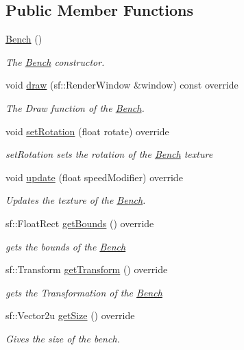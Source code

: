 \subsection*{Public Member Functions}
\begin{DoxyCompactItemize}
\item 
\hyperlink{class_bench_adb6c5dc00554246d493f9acbef4eaf51}{Bench} ()
\begin{DoxyCompactList}\small\item\em The \hyperlink{class_bench}{Bench} constructor. \end{DoxyCompactList}\item 
void \hyperlink{class_bench_a40fc8955782e814153234daa67bc4dd5}{draw} (sf\+::\+Render\+Window \&window) const override
\begin{DoxyCompactList}\small\item\em The Draw function of the \hyperlink{class_bench}{Bench}. \end{DoxyCompactList}\item 
void \hyperlink{class_bench_a8a9e65dde803b5f510fa533724eace75}{set\+Rotation} (float rotate) override
\begin{DoxyCompactList}\small\item\em set\+Rotation sets the rotation of the \hyperlink{class_bench}{Bench} texture \end{DoxyCompactList}\item 
void \hyperlink{class_bench_abb815aa9afeee6e72fa93db3d51cf1a1}{update} (float speed\+Modifier) override
\begin{DoxyCompactList}\small\item\em Updates the texture of the \hyperlink{class_bench}{Bench}. \end{DoxyCompactList}\item 
sf\+::\+Float\+Rect \hyperlink{class_bench_a9483349535b2a8333052993c3a7e02c9}{get\+Bounds} () override
\begin{DoxyCompactList}\small\item\em gets the bounds of the \hyperlink{class_bench}{Bench} \end{DoxyCompactList}\item 
sf\+::\+Transform \hyperlink{class_bench_ab77f7c8625bd343add0cfa4bff48c38b}{get\+Transform} () override
\begin{DoxyCompactList}\small\item\em gets the Transformation of the \hyperlink{class_bench}{Bench} \end{DoxyCompactList}\item 
sf\+::\+Vector2u \hyperlink{class_bench_af34d9a13039d25aaa2bca761513448fc}{get\+Size} () override
\begin{DoxyCompactList}\small\item\em Gives the size of the bench. \end{DoxyCompactList}\end{DoxyCompactItemize}
